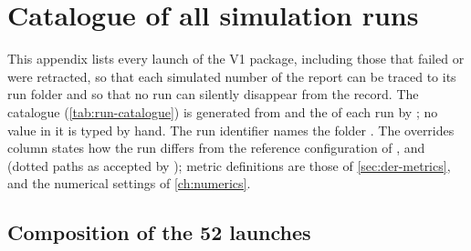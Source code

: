 \chapter{Catalogue of all simulation runs}\label{ch:app-runs}

This appendix lists every launch of the V1 package, including those that failed or were retracted, so that each
simulated number of the report can be traced to its run folder and so that no run can silently disappear from the
record. The catalogue (\cref{tab:run-catalogue}) is generated from  and the
 of each run by ; no value in it is typed by hand. The run
identifier  names the folder . The overrides column states how the
run differs from the reference configuration of ,  and
 (dotted paths as accepted by ); metric definitions are those
of \cref{sec:der-metrics}, and the numerical settings of \cref{ch:numerics}.

\section{Composition of the 52 launches}\label{sec:app-runs-composition}

